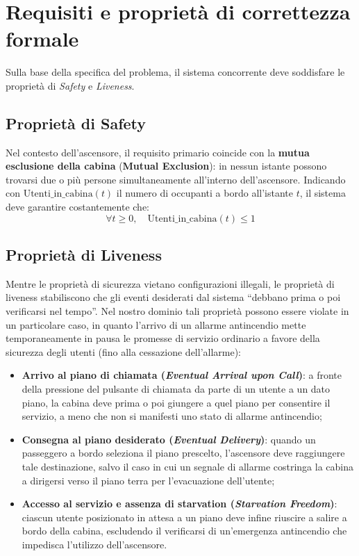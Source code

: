 %
%
\section{Requisiti e proprietà di correttezza formale}
\label{sec:proprieta}
Sulla base della specifica del problema, il sistema concorrente deve soddisfare le proprietà di \emph{Safety} e \emph{Liveness}.

\subsection{Proprietà di Safety}
Nel contesto dell'ascensore, il requisito primario coincide con la \textbf{mutua esclusione della cabina} (\textbf{Mutual Exclusion}): in nessun istante possono trovarsi due o più persone simultaneamente all'interno dell'ascensore.
Indicando con $\text{Utenti\_in\_cabina}(t)$ il numero di occupanti a bordo all'istante $t$, il sistema deve garantire costantemente che:
\[
  \forall t \ge 0, \quad \text{Utenti\_in\_cabina}(t) \le 1
\]

\subsection{Proprietà di Liveness}
Mentre le proprietà di sicurezza vietano configurazioni illegali, le proprietà di liveness stabiliscono che gli eventi desiderati dal sistema ``debbano prima o poi verificarsi nel tempo''.
Nel nostro dominio tali proprietà possono essere violate in un particolare caso, in quanto l'arrivo di un allarme antincendio mette temporaneamente in pausa le promesse di servizio ordinario a favore della sicurezza degli utenti (fino alla cessazione dell'allarme):
\begin{itemize}
  \item \textbf{Arrivo al piano di chiamata (\emph{Eventual Arrival upon Call})}: a fronte della pressione del pulsante di chiamata da parte di un utente a un dato piano, la cabina deve prima o poi giungere a quel piano per consentire il servizio, a meno che non si manifesti uno stato di allarme antincendio;
  \item \textbf{Consegna al piano desiderato (\emph{Eventual Delivery})}: quando un passeggero a bordo seleziona il piano prescelto, l'ascensore deve raggiungere tale destinazione, salvo il caso in cui un segnale di allarme costringa la cabina a dirigersi verso il piano terra per l'evacuazione dell'utente;
  \item \textbf{Accesso al servizio e assenza di starvation (\emph{Starvation Freedom})}: ciascun utente posizionato in attesa a un piano deve infine riuscire a salire a bordo della cabina, escludendo il verificarsi di un'emergenza antincendio che impedisca l'utilizzo dell'ascensore.
\end{itemize}
